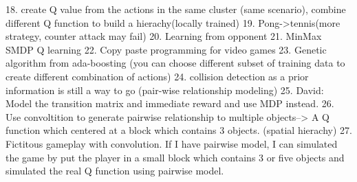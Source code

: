 18. create Q value from the actions in the same cluster (same scenario), combine different Q function to build a hierachy(locally trained)
19. Pong->tennis(more strategy, counter attack may fail)
20. Learning from opponent
21. MinMax SMDP Q learning
22. Copy paste programming for video games
23. Genetic algorithm from ada-boosting (you can choose different subset of training data to create different combination 
of actions)
24. collision detection as a prior information is still a way to go (pair-wise relationship modeling)
25. David: Model the transition matrix and immediate reward and use MDP instead.
26. Use convoltition to generate pairwise relationship to multiple objects--> A Q function which centered at a block which contains 
3 objects. (spatial hierachy)
27. Fictitous gameplay with convolution. If I have pairwise model, I can simulated the game by put the player in a 
small block which contains 3 or five objects and simulated the real Q function using pairwise model.
